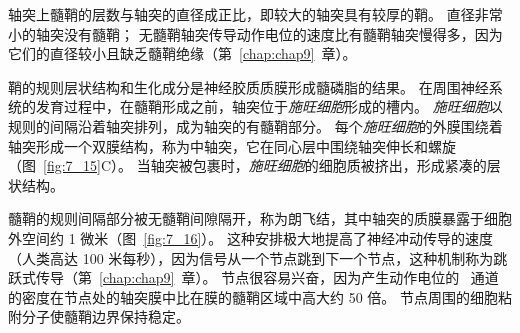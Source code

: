 轴突上髓鞘的层数与轴突的直径成正比，即较大的轴突具有较厚的鞘。
直径非常小的轴突没有髓鞘；
无髓鞘轴突传导动作电位的速度比有髓鞘轴突慢得多，因为它们的直径较小且缺乏髓鞘绝缘（第~\ref{chap:chap9}~章）。


鞘的规则层状结构和生化成分是神经胶质质膜形成髓磷脂的结果。
在周围神经系统的发育过程中，在髓鞘形成之前，轴突位于\textit{施旺细胞}形成的槽内。
\textit{施旺细胞}以规则的间隔沿着轴突排列，成为轴突的有髓鞘部分。
每个\textit{施旺细胞}的外膜围绕着轴突形成一个双膜结构，称为中轴突，它在同心层中围绕轴突伸长和螺旋（图~\ref{fig:7_15}C）。
当轴突被包裹时，\textit{施旺细胞}的细胞质被挤出，形成紧凑的层状结构。


髓鞘的规则间隔部分被无髓鞘间隙隔开，称为朗飞结，其中轴突的质膜暴露于细胞外空间约 1 微米（图~\ref{fig:7_16}）。 
这种安排极大地提高了神经冲动传导的速度（人类高达 100 米每秒），因为信号从一个节点跳到下一个节点，这种机制称为跳跃式传导（第~\ref{chap:chap9}~章）。 
节点很容易兴奋，因为产生动作电位的~ 通道的密度在节点处的轴突膜中比在膜的髓鞘区域中高大约 50 倍。
节点周围的细胞粘附分子使髓鞘边界保持稳定。


